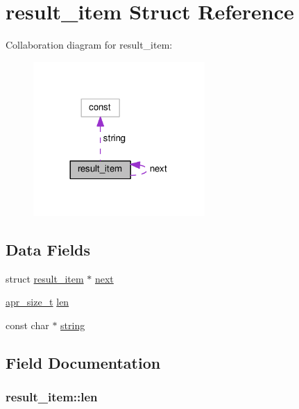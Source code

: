 \hypertarget{structresult__item}{}\section{result\+\_\+item Struct Reference}
\label{structresult__item}


Collaboration diagram for result\+\_\+item\+:
\nopagebreak
\begin{figure}[H]
\begin{center}
\leavevmode
\includegraphics[width=185pt]{structresult__item__coll__graph}
\end{center}
\end{figure}
\subsection*{Data Fields}
\begin{DoxyCompactItemize}
\item 
struct \hyperlink{structresult__item}{result\+\_\+item} $\ast$ \hyperlink{structresult__item_a1ec623e42e0fc227b386f2d82d7ea7b7}{next}
\item 
\hyperlink{group__apr__platform_gaaa72b2253f6f3032cefea5712a27540e}{apr\+\_\+size\+\_\+t} \hyperlink{structresult__item_adfdeea6659b28d46df545fba38a60d05}{len}
\item 
const char $\ast$ \hyperlink{structresult__item_adbfa86ef931fc9b90e2bd16acf33fe8d}{string}
\end{DoxyCompactItemize}


\subsection{Field Documentation}
\subsubsection[{\texorpdfstring{len}{len}}]{ result\+\_\+item\+::len}\hypertarget{structresult__item_adfdeea6659b28d46df545fba38a60d05}{}\label{structresult__item_adfdeea6659b28d46df545fba38a60d05}

